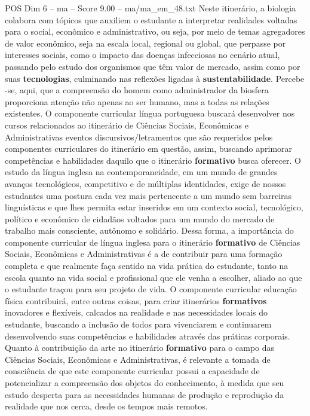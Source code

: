 \begin{textsample}{POS Dim 6 – ma – Score 9.00 – ma/ma\_em\_48.txt}
Neste itinerário, a biologia colabora com tópicos que auxiliem o estudante a interpretar realidades voltadas para o social, econômico e administrativo, ou seja, por meio de temas agregadores de valor econômico, seja na escala local, regional ou global, que perpasse por interesses sociais, como o impacto das doenças infecciosas no cenário atual, passando pelo estudo dos organismos que têm valor de mercado, assim como por suas \textbf{tecnologias}, culminando nas reflexões ligadas à \textbf{sustentabilidade}.
Percebe -se, aqui, que a compreensão do homem como administrador da biosfera proporciona atenção não apenas ao ser humano, mas a todas as relações existentes.
O componente curricular língua portuguesa buscará desenvolver nos cursos relacionados ao itinerário de Ciências Sociais, Econômicas e Administrativas eventos discursivos/letramentos que são requeridos pelos componentes curriculares do itinerário em questão, assim, buscando aprimorar competências e habilidades daquilo que o itinerário \textbf{formativo} busca oferecer.
O estudo da língua inglesa na contemporaneidade, em um mundo de grandes avanços tecnológicos, competitivo e de múltiplas identidades, exige de nossos estudantes uma postura cada vez mais pertencente a um mundo sem barreiras linguísticas e que lhes permita estar inseridos em um contexto social, tecnológico, político e econômico de cidadãos voltados para um mundo do mercado de trabalho mais consciente, autônomo e solidário.
Dessa forma, a importância do componente curricular de língua inglesa para o itinerário \textbf{formativo} de Ciências Sociais, Econômicas e Administrativas é a de contribuir para uma formação completa e que realmente faça sentido na vida prática do estudante, tanto na escola quanto na vida social e profissional que ele venha a escolher, aliado ao que o estudante traçou para seu projeto de vida.
O componente curricular educação física contribuirá, entre outras coisas, para criar itinerários \textbf{formativos} inovadores e flexíveis, calcados na realidade e nas necessidades locais do estudante, buscando a inclusão de todos para vivenciarem e continuarem desenvolvendo suas competências e habilidades através das práticas corporais.
Quanto à contribuição da arte no itinerário \textbf{formativo} para o campo das Ciências Sociais, Econômicas e Administrativas, é relevante a tomada de consciência de que este componente curricular possui a capacidade de potencializar a compreensão dos objetos do conhecimento, à medida que seu estudo desperta para as necessidades humanas de produção e reprodução da realidade que nos cerca, desde os tempos mais remotos.

\end{textsample}
